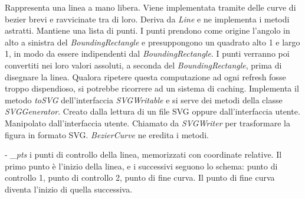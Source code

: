 Rappresenta una linea a mano libera. Viene implementata tramite delle curve di bezier brevi e ravvicinate tra di loro.
Deriva da \textit{Line} e ne implementa i metodi astratti. Mantiene una lista di punti. I punti prendono come origine l'angolo in alto a sinistra del \textit{BoundingRectangle} e presuppongono un quadrato alto 1 e largo 1, in modo da essere indipendenti dal \textit{BoundingRectangle}. I punti verranno poi convertiti nei loro valori assoluti, a seconda del \textit{BoundingRectangle}, prima di disegnare la linea. Qualora ripetere questa computazione ad ogni refresh fosse troppo dispendioso, si potrebbe ricorrere ad un sistema di caching. Implementa il metodo \textit{toSVG} dell'interfaccia \textit{SVGWritable} e si serve dei metodi della classe \textit{SVGGenerator}.
Creato dalla lettura di un file SVG oppure dall'interfaccia utente. Manipolato dall'interfaccia utente. Chiamato da \textit{SVGWriter} per trasformare la figura in formato SVG. \textit{BezierCurve} ne eredita i metodi.
\begin{elencopuntato}[\subsubsecindent]
\item[-] \textit{{\_}pts} i punti di controllo della linea, memorizzati con coordinate relative. Il primo punto \`e l'inizio della linea, e i successivi seguono lo schema: punto di controllo 1, punto di controllo 2, punto di fine curva. Il punto di fine curva diventa l'inizio di quella successiva.
\end{elencopuntato}
